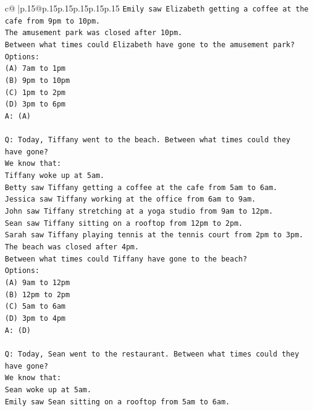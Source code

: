 \documentclass{article}
\begin{document}
{\begin{supertabular}{c@{$\;$}|p{.15\linewidth}@{}p{.15\linewidth}p{.15\linewidth}p{.15\linewidth}p{.15\linewidth}p{.15\linewidth}}
{{{\texttt{Emily saw Elizabeth getting a coffee at the cafe from 9pm to 10pm.} \\
\texttt{The amusement park was closed after 10pm.} \\
\texttt{Between what times could Elizabeth have gone to the amusement park?} \\
\texttt{Options:} \\
\texttt{(A) 7am to 1pm} \\
\texttt{(B) 9pm to 10pm} \\
\texttt{(C) 1pm to 2pm} \\
\texttt{(D) 3pm to 6pm} \\
\texttt{A: (A)} \\
\\ 
\texttt{Q: Today, Tiffany went to the beach. Between what times could they have gone?} \\
\texttt{We know that:} \\
\texttt{Tiffany woke up at 5am.} \\
\texttt{Betty saw Tiffany getting a coffee at the cafe from 5am to 6am.} \\
\texttt{Jessica saw Tiffany working at the office from 6am to 9am.} \\
\texttt{John saw Tiffany stretching at a yoga studio from 9am to 12pm.} \\
\texttt{Sean saw Tiffany sitting on a rooftop from 12pm to 2pm.} \\
\texttt{Sarah saw Tiffany playing tennis at the tennis court from 2pm to 3pm.} \\
\texttt{The beach was closed after 4pm.} \\
\texttt{Between what times could Tiffany have gone to the beach?} \\
\texttt{Options:} \\
\texttt{(A) 9am to 12pm} \\
\texttt{(B) 12pm to 2pm} \\
\texttt{(C) 5am to 6am} \\
\texttt{(D) 3pm to 4pm} \\
\texttt{A: (D)} \\
\\ 
\texttt{Q: Today, Sean went to the restaurant. Between what times could they have gone?} \\
\texttt{We know that:} \\
\texttt{Sean woke up at 5am.} \\
\texttt{Emily saw Sean sitting on a rooftop from 5am to 6am.} \\
}}}
\end{supertabular}}
\end{document}
